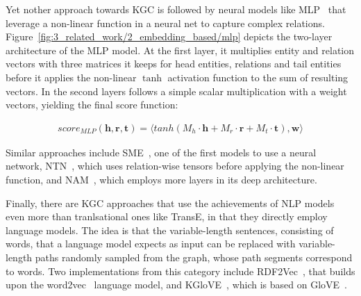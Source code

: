 Yet nother approach towards KGC is followed by neural models like MLP~\cite{Dong2014KnowledgeVA} that leverage a non-linear function in a neural net to capture complex relations. Figure~\ref{fig:3_related_work/2_embedding_based/mlp} depicts the two-layer architecture of the MLP model. At the first layer, it multiplies entity and relation vectors with three matrices it keeps for head entities, relations and tail entities before it applies the non-linear $\tanh$ activation function to the sum of resulting vectors. In the second layers follows a simple scalar multiplication with a weight vectors, yielding the final score function:

\begin{align}
    score_{MLP}(\textbf{h}, \textbf{r}, \textbf{t}) = \langle tanh(M_h \cdot \textbf{h} + M_r \cdot \textbf{r} + M_t \cdot \textbf{t}), \textbf{w} \rangle
    \label{eq:3_related_work/2_embedding_based/mlp}
\end{align}

Similar approaches include SME~\cite{Glorot2013ASM}, one of the first models to use a neural network, NTN~\cite{Socher2013ReasoningWN}, which uses relation-wise tensors before applying the non-linear function, and NAM~\cite{LIU2016ProbabilisticRV}, which employs more layers in its deep architecture.

Finally, there are KGC approaches that use the achievements of NLP models even more than tranlsational ones like TransE, in that they directly employ language models. The idea is that the variable-length sentences, consisting of words, that a language model expects as input can be replaced with variable-length paths randomly sampled from the graph, whose path segments correspond to words. Two implementations from this category include RDF2Vec~\cite{Ristoski2016RDF2VecRG}, that builds upon the word2vec~\cite{Mikolov2013EfficientEO} language model, and KGloVE~\cite{Cochez2017GlobalRV}, which is based on GloVE~\cite{Pennington2014GloveGV}.
